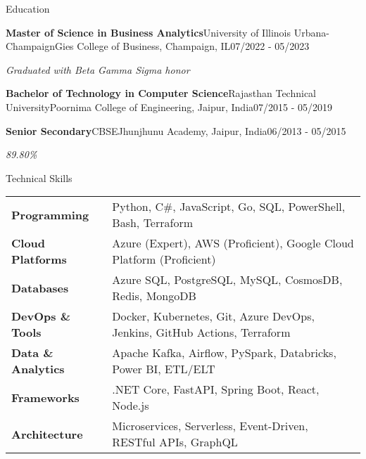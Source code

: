 \documentclass{resume} %
\makeatletter
\newcommand{\italicitem}[1]{\item{\textit{#1}}}
\newcommand{\entry}[2]{#1 & #2 \tabularnewline} %
\newcommand{\tableEnv}[2]{%
    \begin{rSection}{#1} %
        \begin{adjustwidth}{0.0in}{0.1in} %
            \begin{tabularx}{\linewidth}{@{} >{\bfseries}l @{\hspace{6ex}} X @{}}
                #2 %
            \end{tabularx}
        \end{adjustwidth}
    \end{rSection}
}
\makeatother
\begin{document}
    
    
    \begin{rSection}{Education}
        
        \begin{rSubsectionNoBullet}{\bf Master of Science in Business Analytics}{University of Illinois Urbana-Champaign}{Gies College of Business, Champaign, IL}{07/2022 - 05/2023}
            \italicitem{Graduated with Beta Gamma Sigma honor }
        \end{rSubsectionNoBullet}
        
        \begin{rSubsectionNoBullet}{\bf Bachelor of Technology in Computer Science}{Rajasthan Technical University}{Poornima College of Engineering, Jaipur, India}{07/2015 - 05/2019}
            \italicitem{}
        \end{rSubsectionNoBullet}
        
        \begin{rSubsectionNoBullet}{\bf Senior Secondary}{CBSE}{Jhunjhunu Academy, Jaipur, India}{06/2013 - 05/2015}
            \italicitem{89.80\%}
        \end{rSubsectionNoBullet}
        
    \end{rSection}
    
    
    \tableEnv{Technical Skills}{
        \entry{Programming}{Python, C\#, JavaScript, Go, SQL, PowerShell, Bash, Terraform}
        \entry{Cloud Platforms}{Azure (Expert), AWS (Proficient), Google Cloud Platform (Proficient)}
        \entry{Databases}{Azure SQL, PostgreSQL, MySQL, CosmosDB, Redis, MongoDB}
        \entry{DevOps \& Tools}{Docker, Kubernetes, Git, Azure DevOps, Jenkins, GitHub Actions, Terraform}
        \entry{Data \& Analytics}{Apache Kafka, Airflow, PySpark, Databricks, Power BI, ETL/ELT}
        \entry{Frameworks}{.NET Core, FastAPI, Spring Boot, React, Node.js}
        \entry{Architecture}{Microservices, Serverless, Event-Driven, RESTful APIs, GraphQL}
    }
    
\end{document}

